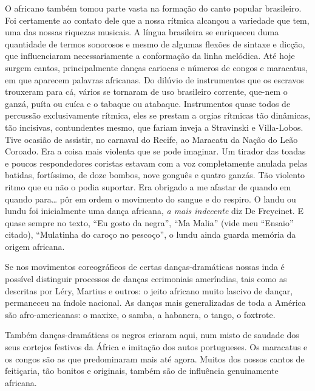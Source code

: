 O africano também tomou parte vasta na formação do canto popular
brasileiro. Foi certamente ao contato dele que a nossa rítmica alcançou
a variedade que tem, uma das nossas riquezas musicais. A língua
brasileira se enriqueceu duma quantidade de termos sonorosos e mesmo de
algumas flexões de sintaxe e dicção, que influenciaram necessariamente a
conformação da linha melódica. Até hoje surgem cantos, principalmente
danças cariocas e números de congos e maracatus, em que aparecem
palavras africanas. Do dilúvio de instrumentos que os escravos trouxeram
para cá, vários se tornaram de uso brasileiro corrente, que-nem o ganzá,
puíta ou cuíca e o tabaque ou atabaque. Instrumentos quase todos de
percussão exclusivamente rítmica, eles se prestam a orgias rítmicas tão
dinâmicas, tão incisivas, contundentes mesmo, que fariam inveja a
Stravinski e Villa-Lobos. Tive ocasião de assistir, no carnaval do
Recife, ao Maracatu da Nação do Leão Coroado. Era a coisa mais violenta
que se pode imaginar. Um tirador das toadas e poucos respondedores
coristas estavam com a voz completamente anulada pelas batidas,
fortíssimo, de doze bombos, nove gonguês e quatro ganzás. Tão violento
ritmo que eu não o podia suportar. Era obrigado a me afastar de quando
em quando para\ldots{} pôr em ordem o movimento do sangue e do respiro. O
landu ou lundu foi inicialmente uma dança africana, \textit{a mais indecente}
diz De Freycinet. E quase sempre no texto, ``Eu gosto da negra'', ``Ma
Malia'' (vide meu ``Ensaio'' citado), ``Mulatinha do caroço no
pescoço'', o lundu ainda guarda memória da origem africana.

Se nos movimentos coreográficos de certas danças-dramáticas nossas inda
é possível distinguir processos de danças cerimoniais ameríndias, tais
como as descritas por Léry, Martius e outros: o jeito africano muito
lascivo de dançar, permaneceu na índole nacional. As danças mais
generalizadas de toda a América são afro-americanas: o maxixe, o samba,
a habanera, o tango, o foxtrote.

Também danças-dramáticas os negros criaram aqui, num misto de saudade
dos seus cortejos festivos da África e imitação dos autos portugueses.
Os maracatus e os congos são as que predominaram mais até agora. Muitos
dos nossos cantos de feitiçaria, tão bonitos e originais, também são de
influência genuinamente africana.

